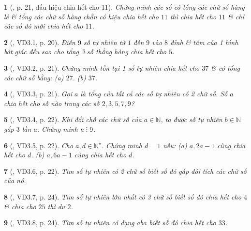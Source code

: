 \documentclass{article}
\newtheorem{baitoan}{}
\DeclareRobustCommand{\divby}{%
	\mathrel{\vbox{\baselineskip.65ex\lineskiplimit0pt\hbox{.}\hbox{.}\hbox{.}}}%
}
\begin{document}
\begin{baitoan}[\cite{TLCT_THCS_Toan_6_so_hoc}, p. 21, dấu hiệu chia hết cho 11]
	Chứng minh các số có tổng các chữ số hàng lẻ \& tổng các chữ số hàng chẵn có hiệu chia hết cho $11$ thì chia hết cho $11$ \& chỉ các số đó mới chia hết cho $11$.
\end{baitoan}

\begin{baitoan}[\cite{TLCT_THCS_Toan_6_so_hoc}, VD3.1, p. 20]
	Điền $9$ số tự nhiên từ $1$ đến $9$ vào $8$ đỉnh \& tâm của 1 hình bát giác đều sao cho tổng 3 số thẳng hàng chia hết cho $5$.
\end{baitoan}

\begin{baitoan}[\cite{TLCT_THCS_Toan_6_so_hoc}, VD3.2, p. 21]
	Chứng minh tồn tại 1 số tự nhiên chia hết cho $37$ \& có tổng các chữ số bằng: (a) $27$. (b) $37$.
\end{baitoan}

\begin{baitoan}[\cite{TLCT_THCS_Toan_6_so_hoc}, VD3.3, p. 21]
	Gọi $a$ là tổng của tất cả các số tự nhiên có 2 chữ số. Số $a$ chia hết cho số nào trong các số $2,3,5,7,9$?
\end{baitoan}

\begin{baitoan}[\cite{TLCT_THCS_Toan_6_so_hoc}, VD3.4, p. 22]
	Khi đổi chỗ các chữ số của $a\in\mathbb{N}$, ta được số tự nhiên $b\in\mathbb{N}$ gấp $3$ lần $a$. Chứng minh $a\divby9$.
\end{baitoan}

\begin{baitoan}[\cite{TLCT_THCS_Toan_6_so_hoc}, VD3.5, p. 22]
	Cho $a,d\in\mathbb{N}^\star$. Chứng minh $d = 1$ nếu: (a) $a,2a - 1$ cùng chia hết cho $d$. (b) $a,6a - 1$ cùng chia hết cho $d$.
\end{baitoan}

\begin{baitoan}[\cite{TLCT_THCS_Toan_6_so_hoc}, VD3.6, p. 22]
	Tìm số tự nhiên có 2 chữ số biết số đó gấp đôi tích các chữ số của nó.
\end{baitoan}

\begin{baitoan}[\cite{TLCT_THCS_Toan_6_so_hoc}, VD3.7, p. 24]
	Tìm số tự nhiên lớn nhất có 3 chữ số biết số đó chia hết cho $4$ \& chia cho $25$ thì dư $2$.
\end{baitoan}

\begin{baitoan}[\cite{TLCT_THCS_Toan_6_so_hoc}, VD3.8, p. 24]
	Tìm số tự nhiên có dạng $\overline{aba}$ biết số đó chia hết cho $33$.
\end{baitoan}
\end{document}
